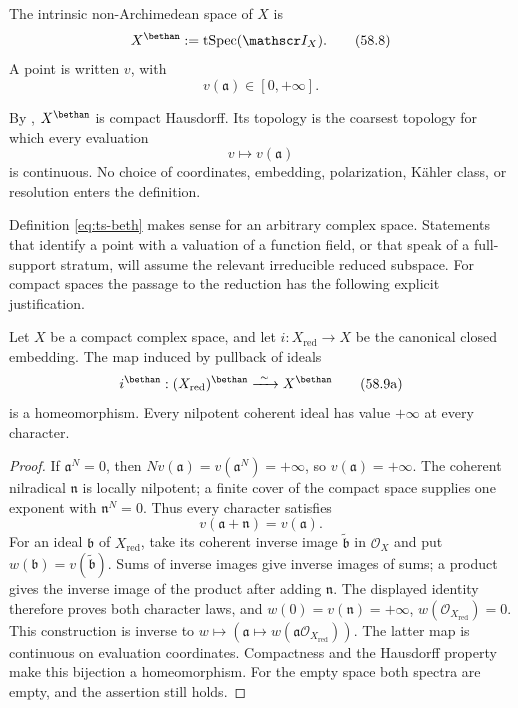 \begin{definition}
\label{def:ts-complex-beth}
The intrinsic non-Archimedean space of $X$ is
\[
                     X^\bethan
                     :=\operatorname{tSpec}(\mathscr I_X).
\tag{58.8}\label{eq:ts-beth}
\]
A point is written $v$, with
\[
 v(\mathfrak a)\in[0,+\infty].
\]
\end{definition}

By , $X^\bethan$ is compact Hausdorff.
Its topology is the coarsest topology for which every evaluation
\[
             v\longmapsto v(\mathfrak a)
\tag{58.9}\label{eq:ts-evaluation}
\]
is continuous.
No choice of coordinates, embedding, polarization, K\"ahler class, or
resolution enters the definition.

\begin{remark}
\label{rem:ts-generality}
Definition \eqref{eq:ts-beth} makes sense for an arbitrary complex space.
Statements that identify a point with a valuation of a function field, or
that speak of a full-support stratum, will assume the relevant irreducible
reduced subspace.
For compact spaces the passage to the reduction has the following
explicit justification.
\end{remark}

\begin{proposition}
\label{prop:ts-reduction}
Let $X$ be a compact complex space, and let $i:X_{\mathrm{red}}\to X$
be the canonical closed embedding. The map induced by pullback of ideals
\[
 i^\bethan:(X_{\mathrm{red}})^\bethan\xrightarrow{\ \sim\ }X^\bethan
\tag{58.9a}\label{eq:ts-reduction}
\]
is a homeomorphism. Every nilpotent coherent ideal has value $+\infty$
at every character.
\end{proposition}

\begin{proof}
If $\mathfrak a^N=0$, then
$N v(\mathfrak a)=v(\mathfrak a^N)=+\infty$, so
$v(\mathfrak a)=+\infty$. The coherent nilradical $\mathfrak n$
is locally nilpotent; a finite cover of the compact space supplies
one exponent with $\mathfrak n^N=0$. Thus every character satisfies
\[
              v(\mathfrak a+\mathfrak n)=v(\mathfrak a).
\]
For an ideal $\mathfrak b$ of $X_{\mathrm{red}}$, take its coherent
inverse image $\widetilde{\mathfrak b}$ in $\mathcal O_X$ and put
$w(\mathfrak b)=v(\widetilde{\mathfrak b})$.
Sums of inverse images give inverse images of sums; a product gives
the inverse image of the product after adding $\mathfrak n$.
The displayed identity therefore proves both character laws, and
$w(0)=v(\mathfrak n)=+\infty$, $w(\mathcal O_{X_{\mathrm{red}}})=0$.
This construction is inverse to
$w\mapsto(\mathfrak a\mapsto w(\mathfrak a\mathcal O_{X_{\mathrm{red}}}))$.
The latter map is continuous on evaluation coordinates. Compactness
and the Hausdorff property make this bijection a homeomorphism.
For the empty space both spectra are empty, and the assertion still holds.
\end{proof}

